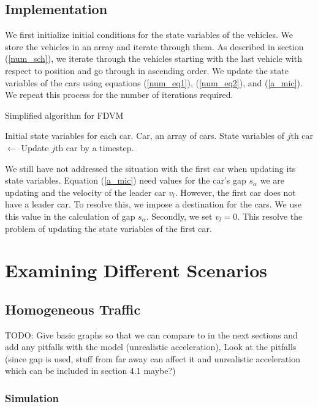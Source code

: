 \documentclass[12pt]{article}
\begin{document}
    \subsection{Implementation}
    We first initialize initial conditions for the state variables of the vehicles. We store the vehicles in an array and iterate through them. As described in section (\ref{num_sch}), we iterate through the vehicles starting with the last vehicle with respect to position and go through in ascending order. We update the state variables of the cars using equations (\ref{num_eq1}), (\ref{num_eq2}), and (\ref{a_mic}). We repeat this process for the number of iterations required. 
    \begin{algorithm}
      \caption{Simplified algorithm for FDVM}\label{alg:car-following}
      \begin{algorithmic}
      \Require Initial state variables for each car. 
      \Require Car, an array of cars.
        \State State variables of $j$th car $\gets$ Update $j$th car by a timestep.
        \EndFor
      \EndFor
      \end{algorithmic}
      \end{algorithm}
    We still have not addressed the situation with the first car when updating its state variables. Equation (\ref{a_mic}) need values for the car's gap $s_\alpha$ we are updating and the velocity of the leader car $v_l$. However, the first car does not have a leader car. To resolve this, we impose a destination for the cars. We use this value in the calculation of gap $s_\alpha$. Secondly, we set $v_l = 0$. This resolve the problem of updating the state variables of the first car. 
    \section{Examining Different Scenarios}
    \subsection{Homogeneous Traffic}
    TODO: Give basic graphs so that we can compare to in the next sections and add any pitfalls with the model (unrealistic acceleration), Look at the pitfalls (since gap is used, stuff from far away can affect it and unrealistic acceleration which can be included in section 4.1 maybe?)
    \subsubsection{Simulation}
\end{document}
